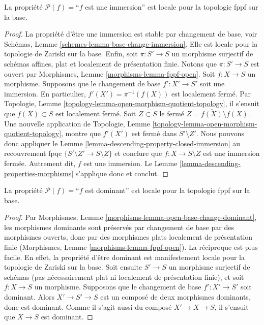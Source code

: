 \begin{lemma}
\label{lemma-descending-fppf-property-immersion}
La propriété $\mathcal{P}(f) =$``$f$ est une immersion''
est locale pour la topologie fppf sur la base.
\end{lemma}

\begin{proof}
La propriété d'être une immersion est stable par changement de base,
voir Schémas, Lemme \ref{schemes-lemma-base-change-immersion}.
Elle est locale pour la topologie de Zariski sur la base.
Enfin, soit
$\pi : S' \to S$ un morphisme surjectif de schémas affines,
plat et localement de présentation finie.
Notons que $\pi : S' \to S$ est ouvert par
Morphismes, Lemme \ref{morphisms-lemma-fppf-open}.
Soit $f : X \to S$ un morphisme.
Supposons que le changement de base $f' : X' \to S'$ soit une immersion.
En particulier, $f'(X') = \pi^{-1}(f(X))$ est localement fermé.
Par Topologie, Lemme \ref{topology-lemma-open-morphism-quotient-topology},
il s'ensuit que $f(X) \subset S$
est localement fermé. Soit $Z \subset S$
le fermé $Z = \overline{f(X)} \setminus f(X)$.
Une nouvelle application de Topologie,
Lemme \ref{topology-lemma-open-morphism-quotient-topology},
montre que $f'(X')$ est fermé dans $S' \setminus Z'$.
Nous pouvons donc appliquer le
Lemme \ref{lemma-descending-property-closed-immersion}
au recouvrement fpqc $\{S' \setminus Z' \to S \setminus Z\}$
et conclure que $f : X \to S \setminus Z$ est une immersion fermée.
Autrement dit, $f$ est une immersion.
Le Lemme \ref{lemma-descending-properties-morphisms} s'applique donc et conclut.
\end{proof}

\begin{lemma}
\label{lemma-descending-fppf-property-dominant}
La propriété $\mathcal{P}(f) =$``$f$ est dominant''
est locale pour la topologie fppf sur la base.
\end{lemma}

\begin{proof}
Par Morphismes,
Lemme \ref{morphisms-lemma-open-base-change-dominant},
les morphismes dominants sont préservés
par changement de base par des morphismes ouverts, donc
par des morphismes plats localement de présentation finie
(Morphismes, Lemme \ref{morphisms-lemma-fppf-open}).
La réciproque est plus facile.
En effet, la propriété d'être dominant est manifestement locale pour la
topologie de Zariski sur la base.
Soit ensuite $S' \to S$ un morphisme surjectif de schémas
(pas nécessairement plat ni localement de présentation finie),
et soit $f : X \to S$ un morphisme. Supposons que le changement de base
$f' : X' \to S'$ soit dominant. Alors $X' \to S'\to S$ est un composé
de deux morphismes dominants, donc est dominant. Comme il s'agit aussi du
composé $X' \to X \to S$, il s'ensuit que $X\to S$ est dominant.
\end{proof}






